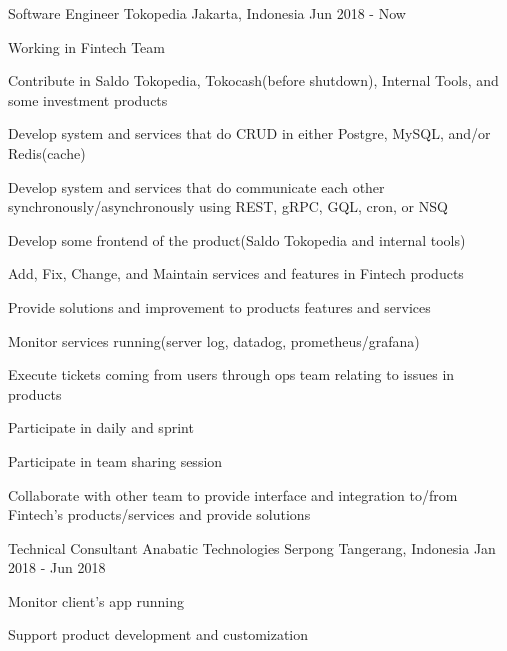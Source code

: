 \begin{cventries}

\cventry
    {Software Engineer}
    {Tokopedia}
    {Jakarta, Indonesia}
    {Jun 2018 - Now}
    {
        \begin{cvitems}
            \item {Working in Fintech Team}
            \item {Contribute in Saldo Tokopedia, Tokocash(before shutdown), Internal Tools, and some investment products}
            \item {Develop system and services that do CRUD in either Postgre, MySQL, and/or Redis(cache)}
            \item {Develop system and services that do communicate each other synchronously/asynchronously using REST, gRPC, GQL, cron, or NSQ}
            \item {Develop some frontend of the product(Saldo Tokopedia and internal tools)}
            \item {Add, Fix, Change, and Maintain services and features in Fintech products}
            \item {Provide solutions and improvement to products features and services}
            \item {Monitor services running(server log, datadog, prometheus/grafana)}
            \item {Execute tickets coming from users through ops team relating to issues in products}
            \item {Participate in daily and sprint}
            \item {Participate in team sharing session}
            \item {Collaborate with other team to provide interface and integration to/from Fintech's products/services and provide solutions}
        \end{cvitems}
    }

\cventry
    {Technical Consultant}
    {Anabatic Technologies}
    {Serpong Tangerang, Indonesia}
    {Jan 2018 - Jun 2018}
    {
        \begin{cvitems}
            \item {Monitor client's app running}
            \item {Support product development and customization}
        \end{cvitems}
    }


\end{cventries}
